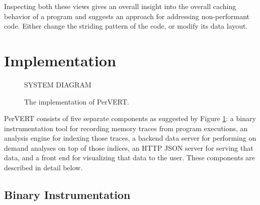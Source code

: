 \documentclass[annual]{acmsiggraph}
\begin{document}
    Inspecting both these views gives an overall insight into the overall caching behavior of a program 
      and suggests an approach for addressing non-performant code.
    Either change the striding pattern of the code, or modify its data layout.

\section {Implementation}

	\begin{figure}[t]
		\centering
    SYSTEM DIAGRAM
		\caption{The implementation of PerVERT.}
    \label{fig:system}
	\end{figure}

  PerVERT consists of five separate components as suggested by Figure \ref{fig:system}:
    a binary instrumentation tool for recording memory traces from program executions,
    an analysis engine for indexing those traces,
    a backend data server for performing on demand analyses on top of those indices,
    an HTTP JSON server for serving that data,
    and a front end for visualizing that data to the user.
  These components are described in detail below.  

  \subsection{Binary Instrumentation}
\end{document}
